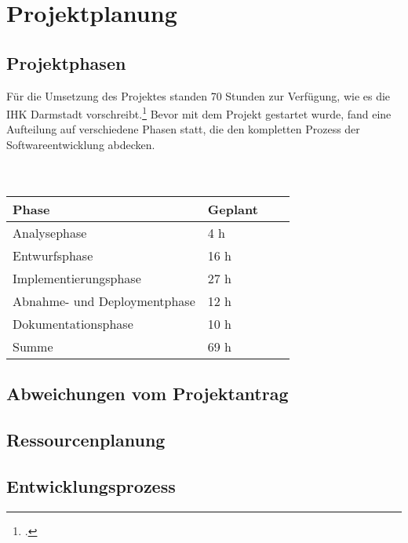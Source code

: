 \section{Projektplanung}

	\subsection{Projektphasen}
	Für die Umsetzung des Projektes standen 70 Stunden zur Verfügung, wie es die IHK Darmstadt vorschreibt.\footcite{2} Bevor mit dem Projekt gestartet wurde, fand eine Aufteilung auf verschiedene Phasen statt,
	die den kompletten Prozess der Softwareentwicklung abdecken.\\ \\ \\

	\begin{table}

		\begin{center}
			\begin{tabular}{llll} \toprule
				Phase & Geplant\\ \bottomrule
				Analysephase & 4 h \\
				Entwurfsphase & 16 h \\
				Implementierungsphase & 27 h \\
				Abnahme- und Deploymentphase & 12 h \\
				Dokumentationsphase & 10 h \\ \bottomrule
				Summe & 69 h \\
			\end{tabular}
		\end{center}
	\end{table}

	

	\vspace{16pt}
	

	\subsection{Abweichungen vom Projektantrag}
	\subsection{Ressourcenplanung}
	\subsection{Entwicklungsprozess}
